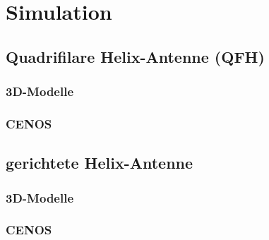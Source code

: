\chapter{Simulation}
\label{chap:sim}

\section{Quadrifilare Helix-Antenne (QFH)}
\label{sec:QFH}

\subsection{3D-Modelle}
\label{subsec:3D-mod-qfh}

\subsection{CENOS}
\label{subsec:cenos-qfh}

\section{gerichtete Helix-Antenne}
\label{sec:Helix}

\subsection{3D-Modelle}
\label{subsec:3D-mod-helix}

\subsection{CENOS}
\label{subsec:cenos-helix}